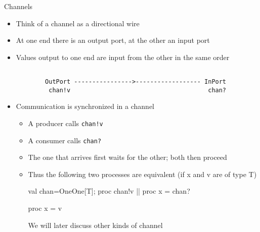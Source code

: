 \documentclass{concdistfoils}
\def\heading#1{\begin{cframed}[8.8in]{#1}\end{cframed}}
\begin{document}
\begin{slide}
\heading{Channels}
\begin{itemize}
\item Think of a channel as a directional wire

\item At one end there is an output port, at the other an input port 

\item Values output to one end are input from the other in the same order
\vfill
\begin{verbatim}

        OutPort ---------------->------------------ InPort  
         chan!v                                      chan?
\end{verbatim}
\vfill
\item Communication is synchronized in a  channel
\begin{itemize}
\item  A producer  calls \texttt{chan!v} 
\item  A consumer  calls \texttt{chan?}
\item  The one that arrives first waits for the other; both then proceed
\item  Thus the following two processes are equivalent (if x and v are of type T)
\begin{scala}
      { val chan=OneOne[T]; proc { chan!v } || proc { x = chan? } }
\end{scala}
\begin{scala}
      proc { x = v }
\end{scala}
\begin{note}
We will later discuss other kinds of channel
\end{note}
\end{itemize}
\vfill
\end{itemize}
\begin{comment}
\begin{note}
\begin{obj}{csoexamples/equivtest}
package csoexamples
import  ox.CSO._
/**
    p1(v) and p2(v) are equivalent processes (the former is less efficient)
    <p>
    p1(v)() and p2(v) both assign v to x
*/
object equivtest
{ def main(args: Array[String]) =
  { var x: String = null
    def p1(v: String) = { val chan = OneOne[String]
                          proc { chan!v } || proc { x = chan? } 
                        }
    def p2(v: String) = proc { x = v }
    p1("foo")();
    Console.println(x);
    p2("bar")();
    Console.println(x);
  }
}
\end{obj}
\end{note}
\end{comment}
\end{slide}
\end{document}
